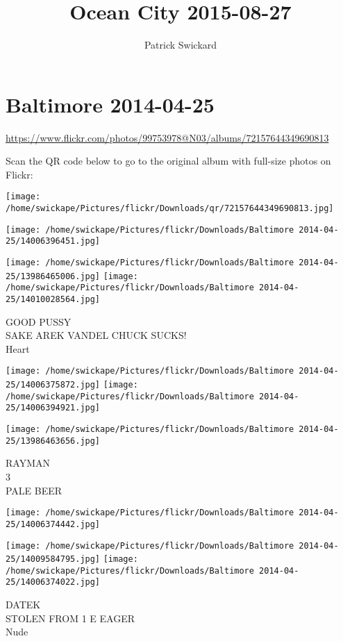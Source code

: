 \documentclass[10pt,letterpaper]{article}
\title{Ocean City 2015-08-27}
\author{Patrick Swickard}
\date{}
\begin{document}
\section*{Baltimore 2014-04-25}

\url{https://www.flickr.com/photos/99753978@N03/albums/72157644349690813}

Scan the QR code below to go to the original album with full-size photos on Flickr:

\texttt{[image: /home/swickape/Pictures/flickr/Downloads/qr/72157644349690813.jpg]}
\pagebreak

\texttt{[image: /home/swickape/Pictures/flickr/Downloads/Baltimore 2014-04-25/14006396451.jpg]}

\vspace{0.25in}
\texttt{[image: /home/swickape/Pictures/flickr/Downloads/Baltimore 2014-04-25/13986465006.jpg]}
\texttt{[image: /home/swickape/Pictures/flickr/Downloads/Baltimore 2014-04-25/14010028564.jpg]}

GOOD PUSSY\\
SAKE AREK VANDEL CHUCK SUCKS!\\
Heart
\pagebreak

\texttt{[image: /home/swickape/Pictures/flickr/Downloads/Baltimore 2014-04-25/14006375872.jpg]}
\texttt{[image: /home/swickape/Pictures/flickr/Downloads/Baltimore 2014-04-25/14006394921.jpg]}

\vspace{0.25in}
\texttt{[image: /home/swickape/Pictures/flickr/Downloads/Baltimore 2014-04-25/13986463656.jpg]}

RAYMAN\\
3\\
PALE BEER
\pagebreak

\texttt{[image: /home/swickape/Pictures/flickr/Downloads/Baltimore 2014-04-25/14006374442.jpg]}

\vspace{0.25in}
\texttt{[image: /home/swickape/Pictures/flickr/Downloads/Baltimore 2014-04-25/14009584795.jpg]}
\texttt{[image: /home/swickape/Pictures/flickr/Downloads/Baltimore 2014-04-25/14006374022.jpg]}

DATEK\\
STOLEN FROM 1 E EAGER\\
Nude
\pagebreak
\end{document}
